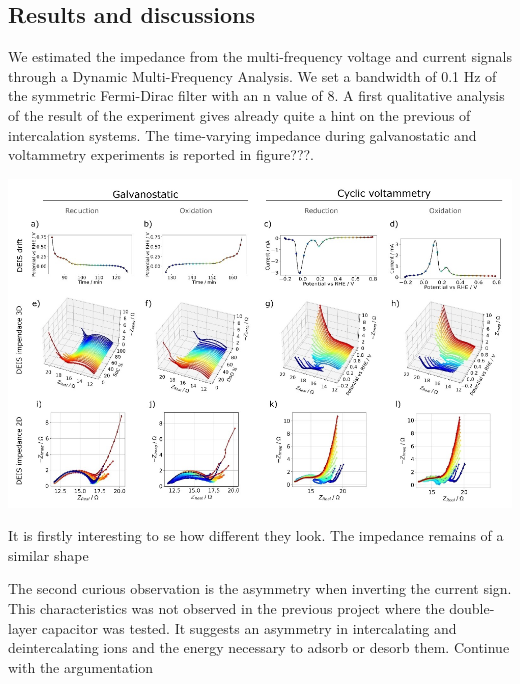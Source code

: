\subsection{Results and discussions}
We estimated the impedance from the multi-frequency voltage and current signals through a Dynamic Multi-Frequency Analysis. We set a bandwidth of 0.1 Hz of the symmetric Fermi-Dirac filter with an n value of 8. A first qualitative analysis of the result of the experiment gives already quite a hint on the previous of intercalation systems. The time-varying impedance during galvanostatic and voltammetry experiments is reported in figure???.
\begin{fullwidth}
    \includegraphics[width=\linewidth]{figures/application2/image3.png}
\end{fullwidth}
It is firstly interesting to se how different they look. The impedance remains of a similar shape

The second curious observation is the asymmetry when inverting the current sign. This characteristics was not observed in the previous project where the double-layer capacitor was tested. It suggests an asymmetry in intercalating and deintercalating ions and the energy necessary to adsorb or desorb them. Continue with the argumentation

\newpage
